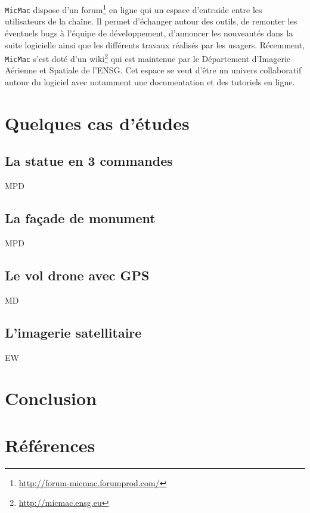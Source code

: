 \documentclass[a4paper,10pt]{article} %
\begin{document}
{\tt MicMac} dispose d'un forum\footnote{\url{http://forum-micmac.forumprod.com/}} en ligne qui un espace d'entraide entre les utilisateurs de la chaîne. Il permet d'échanger autour des outils, de remonter les éventuels bugs à l'équipe de développement, d'annoncer les nouveautés dans la suite logicielle ainsi que les différents travaux réalisés par les usagers. Récemment, {\tt MicMac} s'est doté d'un wiki\footnote{\url{http://micmac.ensg.eu}} qui est maintenue par le Département d'Imagerie Aérienne et Spatiale de l'ENSG. Cet espace se veut d'être un univers collaboratif autour du logiciel avec notamment une documentation et des tutoriels en ligne. 

\section{Quelques cas d'études}
\subsection{La statue en 3 commandes}
MPD
\subsection{La façade de monument}
MPD
\subsection{Le vol drone avec GPS}
MD
\subsection{L'imagerie satellitaire}
EW
\section*{Conclusion}

\section*{Références}
\nocite{*}

\end{document}
